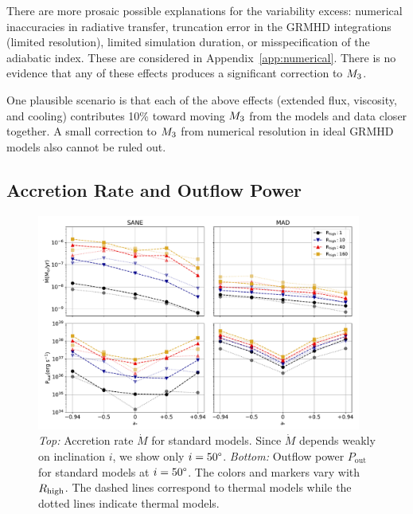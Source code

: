 There are more prosaic possible explanations for the variability excess: numerical inaccuracies in radiative transfer, truncation error in the GRMHD integrations (limited resolution), limited simulation duration, or misspecification of the adiabatic index.  These are considered in Appendix~\ref{app:numerical}.  There is no evidence that any of these effects produces a significant correction to $M_{3}$.

One plausible scenario is that each of the above effects (extended flux, viscosity, and cooling) contributes 10\% toward moving $M_{3}$ from the models and data closer together. A small correction to $M_{3}$ from numerical resolution in ideal GRMHD models also cannot be ruled out.



\subsection{Accretion Rate and Outflow Power}
\label{sec:accrate_outflowpower}



\begin{figure}
  \centering
  \includegraphics[width=0.95\textwidth]{figures/bhac_kharma_average_mdot_pout.pdf}
  \caption{{\it Top:} Accretion rate $\dot{M}$ for standard models. Since $\dot{M}$ depends weakly on inclination $i$, we show only $i=50\degree$. {\it Bottom:} Outflow power $P_\mathrm{out}$ for standard models at $i = 50\degree$. The colors and markers vary with $R_\mathrm{high}$. The dashed lines correspond to \kharma thermal models while the dotted lines indicate \bhac thermal models.}
  \label{fig:accretion_outflow_power_illinois_thermal}
\end{figure}

